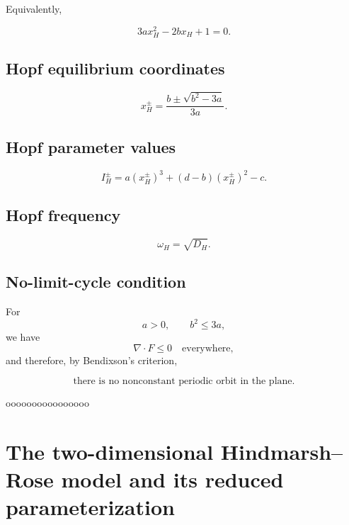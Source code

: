 \documentclass[11pt,a4paper]{article}
\begin{document}
Equivalently,

\begin{equation}
\boxed{
3ax_H^2-2bx_H+1=0.
}
\end{equation}

\subsection*{Hopf equilibrium coordinates}

\begin{equation}
\boxed{
x_H^\pm
=
\frac{
b\pm\sqrt{b^2-3a}
}{
3a
}.
}
\end{equation}

\subsection*{Hopf parameter values}

\begin{equation}
\boxed{
I_H^\pm
=
a(x_H^\pm)^3
+
(d-b)(x_H^\pm)^2
-c.
}
\end{equation}

\subsection*{Hopf frequency}

\begin{equation}
\boxed{
\omega_H=\sqrt{D_H}.
}
\end{equation}

\subsection*{No-limit-cycle condition}

For
\begin{equation}
a>0,\qquad b^2\le3a,
\end{equation}
we have
\begin{equation}
\boxed{
\nabla\cdot F\le0
\quad\text{everywhere},
}
\end{equation}
and therefore, by Bendixson's criterion,

\begin{equation}
\boxed{
\text{there is no nonconstant periodic orbit in the plane}.
}
\end{equation}


oooooooooooooooo

\section{The two-dimensional Hindmarsh--Rose model and its
reduced parameterization}
\end{document}
